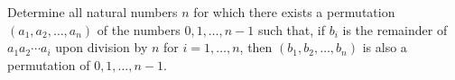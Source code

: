 Determine all natural numbers $n$ for which there exists a permutation $(a_1,a_2,\ldots,a_n)$ of the numbers $0,1,\ldots,n-1$ such that, if $b_i$ is the remainder of $a_1a_2\cdots a_i$ upon division by $n$ for $i=1,\ldots,n$, then $(b_1,b_2,\ldots,b_n)$ is also a permutation of $0,1,\ldots,n-1$.